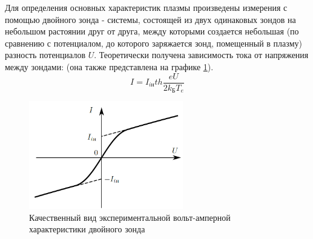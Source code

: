 \documentclass[a4paper,12pt]{article} %
\begin{document}
Для определения основных характеристик плазмы произведены измерения с помощью двойного зонда - системы, состоящей из двух одинаковых зондов на небольшом растоянии друг от друга, между которыми создается небольшая (по сравнению с потенциалом, до которого заряжается зонд, помещенный в плазму) разность потенциалов $U$. Теоретически получена зависимость тока от напряжения между зондами: (она также представлена на графике \ref{двойной}).\cite{labnik}
\begin{equation}
I = I_{iн} th\frac{eU}{2k_БT_e}
\end{equation}
\begin{figure}[h!]
\begin{center}
\includegraphics[width=0.6\textwidth]{Двойной}
\caption{Качественный вид экспериментальной вольт-амперной характеристики двойного зонда \cite{labnik}} \label{двойной}
\end{center}
\end{figure}
\end{document}

